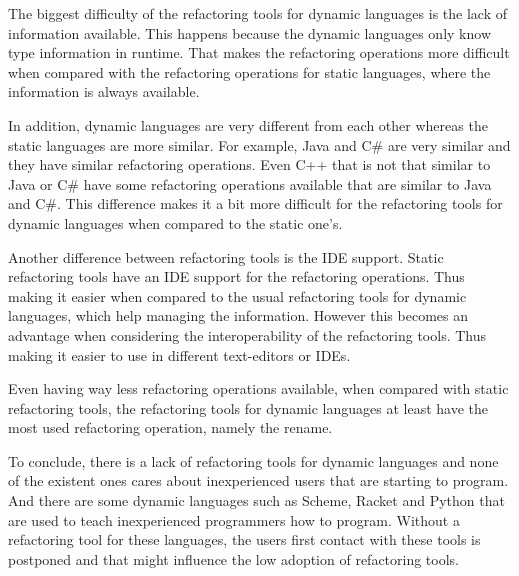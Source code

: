 The biggest difficulty of the refactoring tools for dynamic languages is the lack of information available. 
This happens because the dynamic languages only know type information in runtime. 
That makes the refactoring operations more difficult when compared with the refactoring operations for static languages, where the information is always available.

In addition, dynamic languages are very different from each other whereas the static languages are more similar.
For example, Java and C\# are very similar and they have similar refactoring operations.
Even C++ that is not that similar to Java or C\# have some refactoring operations available that are similar to Java and C\#. 
This difference makes it a bit more difficult for the refactoring tools for dynamic languages when compared to the static one's. %

Another difference between refactoring tools is the IDE support. 
Static refactoring tools have an IDE support for the refactoring operations. 
Thus making it easier when compared to the usual refactoring tools for dynamic languages, which help managing the information. 
However this becomes an advantage when considering the interoperability of the refactoring tools. 
Thus making it easier to use in different text-editors or IDEs.

Even having way less refactoring operations available, when compared with static refactoring tools, the refactoring tools for dynamic languages at least have the most used refactoring operation, namely the rename.









To conclude, there is a lack of refactoring tools for dynamic languages and none of the existent ones cares about inexperienced users that are starting to program. 
And there are some dynamic languages such as Scheme, Racket and Python that are used to teach inexperienced programmers how to program.
Without a refactoring tool for these languages, the users first contact with these tools is postponed and that might influence the low adoption of refactoring tools.
